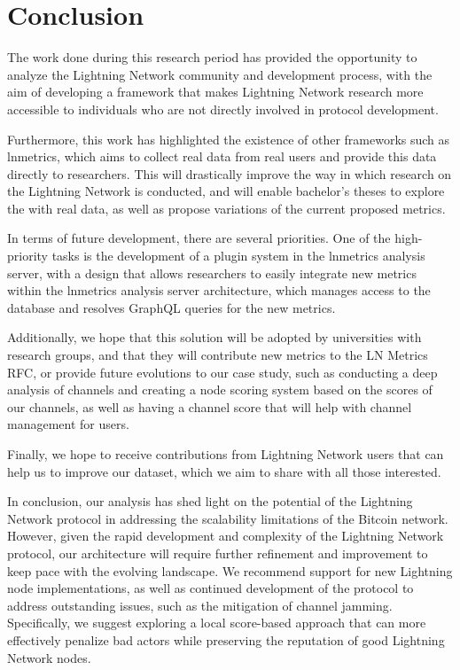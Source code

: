 \chapter{Conclusion}
\label{chap:conclusion}

The work done during this research period has provided the opportunity
to analyze the Lightning Network community and development process,
with the aim of developing a framework that makes Lightning Network
research more accessible to individuals who are not directly
involved in protocol development.

Furthermore, this work has highlighted the existence of other
frameworks such as lnmetrics, which aims to collect real data from
real users and provide this data directly to researchers. This will
drastically improve the way in which research on the Lightning Network is
conducted, and will enable bachelor's theses to explore the {\LN}
with real data, as well as propose variations of the current proposed metrics.

In terms of future development, there are several priorities.
One of the high-priority tasks is the development of a plugin system
in the lnmetrics analysis server, with a design that allows researchers to easily
integrate new metrics within the lnmetrics analysis server architecture,
which manages access to the database and resolves GraphQL queries for the new metrics.

Additionally, we hope that this solution will be adopted by universities with {\LN}
research groups, and that they will contribute new metrics to the LN Metrics RFC,
or provide future evolutions to our case study, such as conducting a deep analysis
of channels and creating a node scoring system based on the scores of our channels,
as well as having a channel score that will help with channel management for users.

Finally, we hope to receive contributions from Lightning Network users that can
help us to improve our dataset, which we aim to share with all those interested.

In conclusion, our analysis has shed light on the potential of the Lightning Network
protocol in addressing the scalability limitations of the Bitcoin network. However,
given the rapid development and complexity of the Lightning Network protocol, our
architecture will require further refinement and improvement to keep pace with the
evolving landscape. We recommend support for new Lightning node implementations, as well
as continued development of the protocol to address outstanding issues, such as the mitigation
of channel jamming. Specifically, we suggest exploring a local score-based approach that can more
effectively penalize bad actors while preserving the reputation of good Lightning Network nodes.
